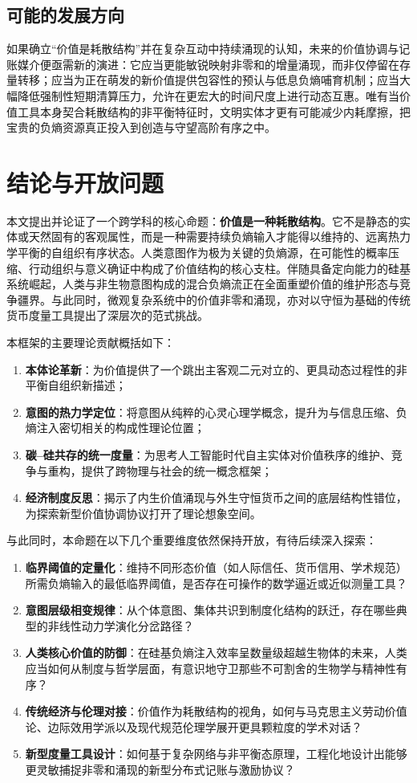 \documentclass[11pt,a4paper]{ctexart}
\begin{document}
\subsection{可能的发展方向}
如果确立“价值是耗散结构”并在复杂互动中持续涌现的认知，未来的价值协调与记账媒介便亟需新的演进：它应当更能敏锐映射非零和的增量涌现，而非仅停留在存量转移；应当为正在萌发的新价值提供包容性的预认与低息负熵哺育机制；应当大幅降低强制性短期清算压力，允许在更宏大的时间尺度上进行动态互惠。唯有当价值工具本身契合耗散结构的非平衡特征时，文明实体才更有可能减少内耗摩擦，把宝贵的负熵资源真正投入到创造与守望高阶有序之中。

\section{结论与开放问题}

本文提出并论证了一个跨学科的核心命题：\textbf{价值是一种耗散结构}。它不是静态的实体或天然固有的客观属性，而是一种需要持续负熵输入才能得以维持的、远离热力学平衡的自组织有序状态。人类意图作为极为关键的负熵源，在可能性的概率压缩、行动组织与意义确证中构成了价值结构的核心支柱。伴随具备定向能力的硅基系统崛起，人类与非生物意图构成的混合负熵流正在全面重塑价值的维护形态与竞争疆界。与此同时，微观复杂系统中的价值非零和涌现，亦对以守恒为基础的传统货币度量工具提出了深层次的范式挑战。

本框架的主要理论贡献概括如下：
\begin{enumerate}
    \item \textbf{本体论革新}：为价值提供了一个跳出主客观二元对立的、更具动态过程性的非平衡自组织新描述；
    \item \textbf{意图的热力学定位}：将意图从纯粹的心灵心理学概念，提升为与信息压缩、负熵注入密切相关的构成性理论位置；
    \item \textbf{碳--硅共存的统一度量}：为思考人工智能时代自主实体对价值秩序的维护、竞争与重构，提供了跨物理与社会的统一概念框架；
    \item \textbf{经济制度反思}：揭示了内生价值涌现与外生守恒货币之间的底层结构性错位，为探索新型价值协调协议打开了理论想象空间。
\end{enumerate}

与此同时，本命题在以下几个重要维度依然保持开放，有待后续深入探索：
\begin{enumerate}
    \item \textbf{临界阈值的定量化}：维持不同形态价值（如人际信任、货币信用、学术规范）所需负熵输入的最低临界阈值，是否存在可操作的数学逼近或近似测量工具？
    \item \textbf{意图层级相变规律}：从个体意图、集体共识到制度化结构的跃迁，存在哪些典型的非线性动力学演化分岔路径？
    \item \textbf{人类核心价值的防御}：在硅基负熵注入效率呈数量级超越生物体的未来，人类应当如何从制度与哲学层面，有意识地守卫那些不可割舍的生物学与精神性有序？
    \item \textbf{传统经济与伦理对接}：价值作为耗散结构的视角，如何与马克思主义劳动价值论、边际效用学派以及现代规范伦理学展开更具颗粒度的学术对话？
    \item \textbf{新型度量工具设计}：如何基于复杂网络与非平衡态原理，工程化地设计出能够更灵敏捕捉非零和涌现的新型分布式记账与激励协议？
\end{enumerate}
\end{document}
